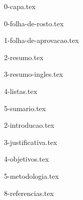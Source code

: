 \documentclass[12pt,nodisplayskipstretch]{article}
\begin{document}


{0-capa.tex}

{0-folha-de-rosto.tex}

{1-folha-de-aprovacao.tex}

{2-resumo.tex}

{3-resumo-ingles.tex}

{4-listas.tex}

{5-sumario.tex}


{2-introducao.tex}

{3-justificativa.tex}

{4-objetivos.tex}

{5-metodologia.tex}

{8-referencias.tex}
\end{document}
